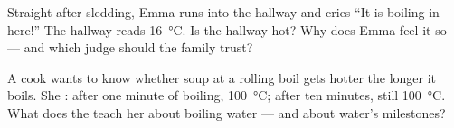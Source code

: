 \begin{exercise}[$\star\star$]\label{exo:g3:temperature-thermometers:10}
Straight after sledding, Emma runs into the hallway and cries ``It
is boiling in here!'' The hallway  reads
\qty{16}{\celsius}. Is the hallway hot? Why does Emma feel it so ---
and which judge should the family trust?
\end{exercise}

\begin{exercise}[$\star\star$]\label{exo:g3:temperature-thermometers:11}
A cook wants to know whether soup at a rolling boil gets hotter the
longer it boils. She : after one minute of boiling,
\qty{100}{\celsius}; after ten minutes, still \qty{100}{\celsius}.
What does the  teach her about boiling water --- and
about water's milestones?
\end{exercise}

